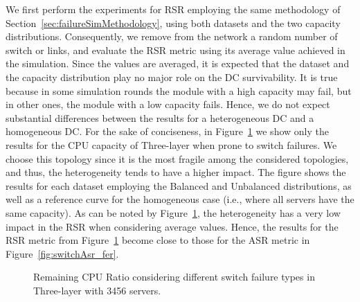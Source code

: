 We first perform the experiments for RSR employing the same methodology of Section~\ref{sec:failureSimMethodology}, using both datasets and the two capacity distributions. Consequently, we remove from the network a random number of switch or links, and evaluate the RSR metric using its average value achieved in the simulation. Since the values are averaged, it is expected that the dataset and the capacity distribution play no major role on the DC survivability. It is true because in some simulation rounds the module with a high capacity may fail, but in other ones, the module with a low capacity fails. Hence, we do not expect substantial differences between the results for a heterogeneous DC and a homogeneous DC. For the sake of conciseness, in Figure~\ref{fig:3k_het_switch_3Tier} we show only the results for the CPU capacity of Three-layer when prone to switch failures. We choose this topology since it is the most fragile among the considered topologies, and thus, the heterogeneity tends to have a higher impact. The figure shows the results for each dataset employing the Balanced and Unbalanced distributions, as well as a reference curve for the homogeneous case (i.e., where all servers have the same capacity). As can be noted by Figure~\ref{fig:3k_het_switch_3Tier}, the heterogeneity has a very low impact in the RSR when considering average values. Hence, the results for the RSR metric from Figure~\ref{fig:3k_het_switch_3Tier} become close to those for the ASR metric in Figure~\ref{fig:switchAsr_fer}.

\begin{figure}[h!]
\centering
{}
\caption{Remaining CPU Ratio considering different switch failure types in Three-layer with 3456 servers.}
\label{fig:3k_het_switch_3Tier}
\end{figure}

